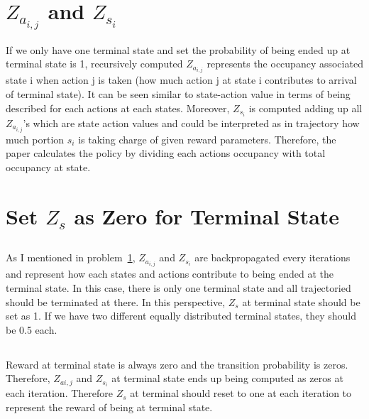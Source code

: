 \documentclass[11pt]{article}
\begin{document}
\section{$Z_{a_{i,j}}$ and $Z_{s_i}$}
\label{sec:_z__a__ij_and_z__s_i_}

If we only have one terminal state and set the probability of being ended up at
terminal state is 1, recursively computed $Z_{a_{i,j}}$ represents the
occupancy associated state i when action j is taken (how much action j at state
i contributes to arrival of terminal state). It can be seen similar to
state-action value in terms of being described for each actions at each states.
Moreover, $Z_{s_i}$ is computed adding up all $Z_{a_{i,j}}$'s which are state
action values and could be interpreted as in trajectory how much portion $s_i$
is taking charge of given reward parameters. Therefore, the paper calculates
the policy by dividing each actions occupancy with total occupancy at state.

\section{Set $Z_{s}$ as Zero for Terminal State}
\label{sec:_z__s_set_to_zero_for_terminal_state}
\subsection{}
\label{sub:1}

As I mentioned in problem~\ref{sec:_z__a__ij_and_z__s_i_}, $Z_{a_{i,j}}$ and
$Z_{s_i}$ are backpropagated every iterations and represent how each states and
actions contribute to being ended at the terminal state. In this case, there is
only one terminal state and all trajectoried should be terminated at there. In
this perspective, $Z_s$ at terminal state should be set as 1. If we have two
 different equally distributed terminal states, they should be 0.5 each.

\subsection{}
\label{sub:2}

Reward at terminal state is always zero and the transition probability is
zeros.  Therefore, $Z_{a{i,j}}$ and $Z_{s_i}$ at terminal state ends up being
computed as zeros at each iteration. Therefore $Z_{s}$ at terminal should reset
to one at each iteration to represent the reward of being at terminal state.
\end{document}
